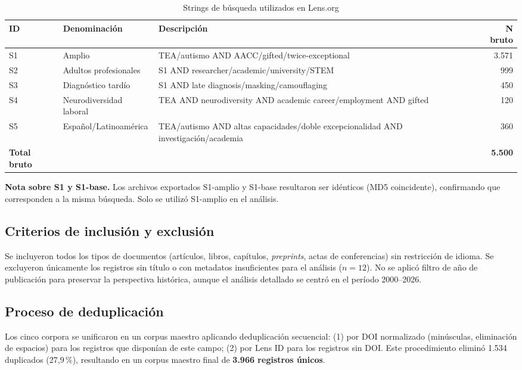 \documentclass[12pt, a4paper]{article}
\begin{document}
\begin{table}[H]
\centering
\caption{Strings de búsqueda utilizados en Lens.org}
\label{tab:strings}
\small
\begin{tabularx}{\textwidth}{@{}l p{3cm} X r@{}}
\toprule
\textbf{ID} & \textbf{Denominación} & \textbf{Descripción} & \textbf{N bruto} \\
\midrule
S1 & Amplio & TEA/autismo AND AACC/gifted/twice-exceptional & 3.571 \\
S2 & Adultos profesionales & S1 AND researcher/academic/university/STEM & 999 \\
S3 & Diagnóstico tardío & S1 AND late diagnosis/masking/camouflaging & 450 \\
S4 & Neurodiversidad laboral & TEA AND neurodiversity AND academic career/employment AND gifted & 120 \\
S5 & Español/Latinoamérica & TEA/autismo AND altas capacidades/doble excepcionalidad AND investigación/academia & 360 \\
\midrule
\textbf{Total bruto} & & & \textbf{5.500} \\
\bottomrule
\end{tabularx}
\end{table}

\begin{notabox}
\textbf{Nota sobre S1 y S1-base.} Los archivos exportados S1-amplio y S1-base
resultaron ser idénticos (MD5 coincidente), confirmando que corresponden a la misma
búsqueda. Solo se utilizó S1-amplio en el análisis.
\end{notabox}

\subsection{Criterios de inclusión y exclusión}

Se incluyeron todos los tipos de documentos (artículos, libros, capítulos,
\textit{preprints}, actas de conferencias) sin restricción de idioma. Se excluyeron
únicamente los registros sin título o con metadatos insuficientes para el análisis
($n=12$). No se aplicó filtro de año de publicación para preservar la perspectiva
histórica, aunque el análisis detallado se centró en el período 2000--2026.

\subsection{Proceso de deduplicación}

Los cinco corpora se unificaron en un corpus maestro aplicando deduplicación
secuencial: (1) por DOI normalizado (minúsculas, eliminación de espacios) para los
registros que disponían de este campo; (2) por Lens ID para los registros sin DOI.
Este procedimiento eliminó 1.534 duplicados (27,9\,\%), resultando en un corpus
maestro final de \textbf{3.966 registros únicos}.
\end{document}
